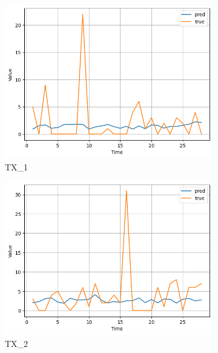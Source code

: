 \documentclass[12pt]{article}
\begin{document}
\begin{figure}[H]
\begin{subfigure}[b]{0.2\textwidth}
        \includegraphics[width=\textwidth]{image/output3.png}
        \caption{TX\_1}
        \label{fig:output3}
    \end{subfigure}
    \begin{subfigure}[b]{0.2\textwidth}
        \includegraphics[width=\textwidth]{image/output4.png}
        \caption{TX\_2}
        \label{fig:output4}
    \end{subfigure}
    \\
    \begin{subfigure}[b]{0.2\textwidth}

\end{subfigure}
\end{figure}
\end{document}
